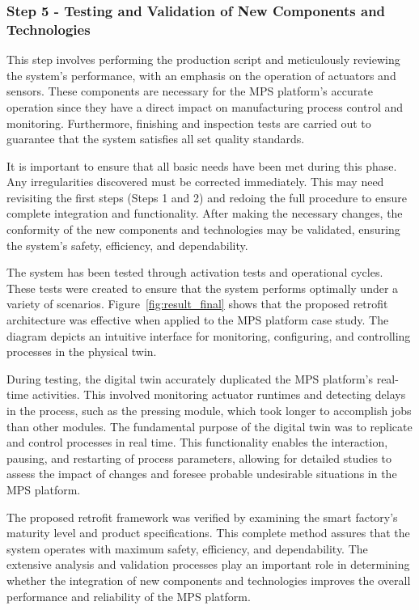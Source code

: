 \documentclass[journal]{IEEEtran}
\begin{document}
\subsubsection{Step 5 - Testing and Validation of New Components and Technologies}

This step involves performing the production script and meticulously reviewing the system's performance, with an emphasis on the operation of actuators and sensors. These components are necessary for the MPS platform's accurate operation since they have a direct impact on manufacturing process control and monitoring. Furthermore, finishing and inspection tests are carried out to guarantee that the system satisfies all set quality standards.

It is important to ensure that all basic needs have been met during this phase. Any irregularities discovered must be corrected immediately. This may need revisiting the first steps (Steps 1 and 2) and redoing the full procedure to ensure complete integration and functionality. After making the necessary changes, the conformity of the new components and technologies may be validated, ensuring the system's safety, efficiency, and dependability.

The system has been tested through activation tests and operational cycles. These tests were created to ensure that the system performs optimally under a variety of scenarios. Figure~\ref{fig:result_final} shows that the proposed retrofit architecture was effective when applied to the MPS platform case study. The diagram depicts an intuitive interface for monitoring, configuring, and controlling processes in the physical twin.

During testing, the digital twin accurately duplicated the MPS platform's real-time activities. This involved monitoring actuator runtimes and detecting delays in the process, such as the pressing module, which took longer to accomplish jobs than other modules. The fundamental purpose of the digital twin was to replicate and control processes in real time. This functionality enables the interaction, pausing, and restarting of process parameters, allowing for detailed studies to assess the impact of changes and foresee probable undesirable situations in the MPS platform.

The proposed retrofit framework was verified by examining the smart factory's maturity level and product specifications. This complete method assures that the system operates with maximum safety, efficiency, and dependability. The extensive analysis and validation processes play an important role in determining whether the integration of new components and technologies improves the overall performance and reliability of the MPS platform.
\end{document}
